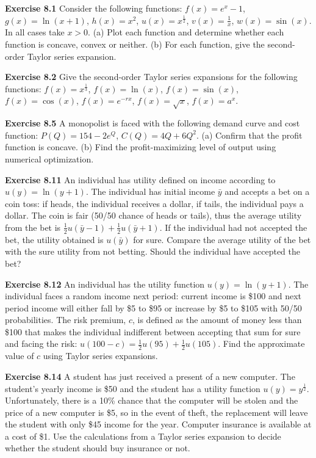 \begin{original}
\textbf{Exercise 8.1} Consider the following functions: $f(x) = e^x - 1$, $g(x) = \ln(x + 1)$, $h(x) = x^2$, $u(x) = x^{\frac{1}{2}}$, $v(x) = \frac{1}{x}$, $w(x) = \sin(x)$. In all cases take $x > 0$. (a) Plot each function and determine whether each function is concave, convex or neither. (b) For each function, give the second-order Taylor series expansion.

\textbf{Exercise 8.2} Give the second-order Taylor series expansions for the following functions: $f(x) = x^{\frac{1}{3}}$, $f(x) = \ln(x)$, $f(x) = \sin(x)$, $f(x) = \cos(x)$, $f(x) = e^{-rx}$, $f(x) = \sqrt{x}$, $f(x) = a^x$.

\textbf{Exercise 8.5} A monopolist is faced with the following demand curve and cost function: $P(Q) = 154 - 2e^Q$, $C(Q) = 4Q + 6Q^2$. (a) Confirm that the profit function is concave. (b) Find the profit-maximizing level of output using numerical optimization.

\textbf{Exercise 8.11} An individual has utility defined on income according to $u(y) = \ln(y + 1)$. The individual has initial income $\bar{y}$ and accepts a bet on a coin toss: if heads, the individual receives a dollar, if tails, the individual pays a dollar. The coin is fair (50/50 chance of heads or tails), thus the average utility from the bet is $\frac{1}{2}u(\bar{y} - 1) + \frac{1}{2}u(\bar{y} + 1)$. If the individual had not accepted the bet, the utility obtained is $u(\bar{y})$ for sure. Compare the average utility of the bet with the sure utility from not betting. Should the individual have accepted the bet?

\textbf{Exercise 8.12} An individual has the utility function $u(y) = \ln(y + 1)$. The individual faces a random income next period: current income is \$100 and next period income will either fall by \$5 to \$95 or increase by \$5 to \$105 with 50/50 probabilities. The risk premium, $c$, is defined as the amount of money less than \$100 that makes the individual indifferent between accepting that sum for sure and facing the risk: $u(100 - c) = \frac{1}{2}u(95) + \frac{1}{2}u(105)$. Find the approximate value of $c$ using Taylor series expansions.

\textbf{Exercise 8.14} A student has just received a present of a new computer. The student's yearly income is \$50 and the student has a utility function $u(y) = y^{\frac{1}{2}}$. Unfortunately, there is a 10\% chance that the computer will be stolen and the price of a new computer is \$5, so in the event of theft, the replacement will leave the student with only \$45 income for the year. Computer insurance is available at a cost of \$1. Use the calculations from a Taylor series expansion to decide whether the student should buy insurance or not.


\end{original}
